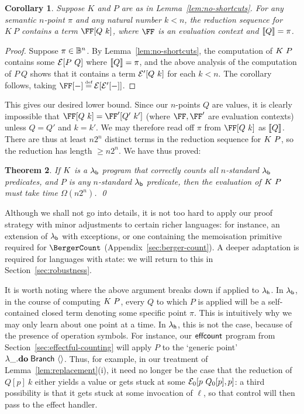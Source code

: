 \documentclass[12pt,phd,lfcs,twoside,openright,logo,leftchapter,normalheadings]{infthesis}
\theoremstyle{plain}
\newtheorem{theorem}{Theorem}[chapter]
\newtheorem{corollary}[theorem]{Corollary}
\theoremstyle{definition}
\begin{document}
\begin{corollary}
  Suppose $K$ and $P$ are as in Lemma~\ref{lem:no-shortcuts}.  For any
  semantic $n$-point $\pi$ and any natural number $k < n$, the
  reduction sequence for $K~P$ contains a term $\FF[Q~k]$, where $\FF$
  is an evaluation context and $\llbracket Q \rrbracket =\pi$.
\end{corollary}

\begin{proof}
  Suppose $\pi \in \mathbb{B}^n$. By Lemma~\ref{lem:no-shortcuts}, the
  computation of $K~P$ contains some $\mathcal{E}[P~Q]$ where
  $\llbracket Q \rrbracket = \pi$, and the above analysis of the computation of $P~Q$
  shows that it contains a term $\mathcal{E}'[Q~k]$ for each $k < n$. The
  corollary follows, taking $\FF[-] \defas \EC[\EC'[-]]$.
\end{proof}

This gives our desired lower bound. Since our $n$-points $Q$ are
values, it is clearly impossible that $\FF[Q~k] = \FF'[Q'~k']$ (where
$\FF,\FF'$ are evaluation contexts) unless $Q=Q'$ and $k=k'$.  We may
therefore read off $\pi$ from $\FF[Q~k]$ as $\val{Q}$.  There are thus
at least $n2^n$ distinct terms in the reduction sequence for
$K~P$, so the reduction has length $\geq n 2^n$.  We have
thus proved:

\begin{theorem}
  If $K$ is a $\lambda_{\mathsf{b}}$ program that correctly counts all $n$-standard $\lambda_{\mathsf{b}}$ predicates,
  and $P$ is any $n$-standard $\lambda_{\mathsf{b}}$ predicate, then the evaluation of $K~P$ must take time
  $\Omega(n2^n)$.  \qed
\end{theorem}

Although we shall not go into details, it is not too hard to apply our
proof strategy with minor adjustments to certain richer languages: for
instance, an extension of $\lambda_{\mathsf{b}}$ with exceptions, or one containing
the memoisation primitive required for $\BergerCount$
(Appendix~\ref{sec:berger-count}). A deeper adaptation is required
for languages with state: we will return to this in
Section~\ref{sec:robustness}.

It is worth noting where the above argument breaks down if applied to $\lambda_{\mathsf{h}}$.
In $\lambda_{\mathsf{b}}$, in the course of computing $K~P$, every $Q$ to which $P$ is applied
will be a self-contained closed term denoting some specific point $\pi$.
This is intuitively why we may only learn about one point at a time.
In $\lambda_{\mathsf{h}}$, this is not the case, because of the presence of operation symbols.
For instance, our $\mathsf{effcount}$ program from Section~\ref{sec:effectful-counting}
will apply $P$ to the `generic point' $\lambda\_.\mathbf{do}\;\mathsf{Branch}~\langle  \rangle$.
Thus, for example, in our treatment of Lemma~\ref{lem:replacement}(i),
it need no longer be the case that the reduction of $Q[p]~k$ either yields a value
or gets stuck at some $\mathcal{E}_0[p~Q_0[p],p]$: a third possibility is that it gets stuck
at some invocation of $\ell$, so that control will then pass to the effect handler.
\end{document}
